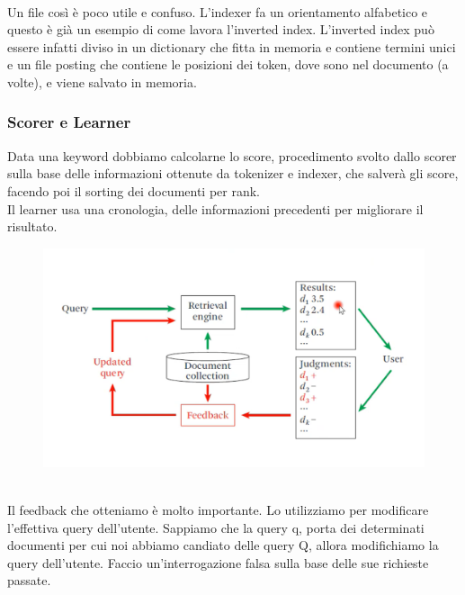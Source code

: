 \\
Un file così è poco utile e confuso. L'indexer fa un orientamento alfabetico e questo è già un esempio di come lavora l'inverted index. L'inverted index può essere infatti diviso in un dictionary che fitta in memoria e contiene termini unici e un file posting che contiene le posizioni dei token, dove sono nel documento (a volte), e viene salvato in memoria. 

\subsubsection{Scorer e Learner}
Data una keyword dobbiamo calcolarne lo score, procedimento svolto dallo scorer sulla base delle informazioni ottenute da tokenizer e indexer, che salverà gli score, facendo poi il sorting dei documenti per rank. 
\\
Il learner usa una cronologia, delle informazioni precedenti per migliorare il risultato. 
\\
\begin{figure}[th]
    \centering
    \includegraphics[scale=0.4]{Text Analysis/img/learner.png}
\end{figure}
\\
Il feedback che otteniamo è molto importante. Lo utilizziamo per modificare l'effettiva query dell'utente. Sappiamo che la query q, porta dei determinati documenti per cui noi abbiamo candiato delle query Q, allora modifichiamo la query dell'utente. Faccio un'interrogazione falsa sulla base delle sue richieste passate. 

